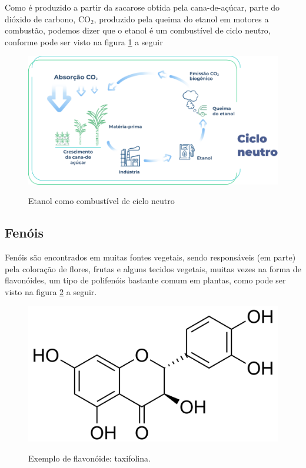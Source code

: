 Como é produzido a partir da sacarose obtida pela cana-de-açúcar, parte do dióxido de carbono, CO$_2$, produzido pela queima do etanol em motores a combustão, podemos dizer que o etanol é um combustível de ciclo neutro, conforme pode ser visto na figura \ref{fig:neutro} a seguir

 \begin{figure}[h]
 	\centering
 	\caption{Etanol como combustível de ciclo neutro}
 	\vspace{0.5cm}
 	\includegraphics[width=1\linewidth]{imagens/ciclo-neutro.png}
 	\label{fig:neutro}
 \end{figure}

\subsection{Fenóis}
Fenóis são encontrados em muitas fontes vegetais, sendo responsáveis (em parte) pela coloração de flores, frutas e alguns tecidos vegetais, muitas vezes na forma de flavonóides, um tipo de polifenóis bastante comum em plantas, como pode ser visto na figura \ref{fig:taxi} a seguir.

\begin{figure}[h]
    \centering
    \caption{Exemplo de flavonóide: taxifolina.}
    \vspace{0.5cm}
    \includegraphics[width=0.6\linewidth]{imagens/taxifolina.png}
\label{fig:taxi}
\end{figure}

